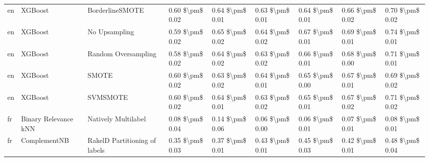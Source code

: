 \begin{tabular}{lllllllll}
      en &                         XGBoost &               BorderlineSMOTE & 0.60 \$\textbackslash pm\$ 0.02 &           0.64 \$\textbackslash pm\$ 0.01 &       0.63 \$\textbackslash pm\$ 0.01 &        0.64 \$\textbackslash pm\$ 0.01 &                         0.66 \$\textbackslash pm\$ 0.02 &     0.70 \$\textbackslash pm\$ 0.02 \\
      en &                         XGBoost &                 No Upsampling & 0.59 \$\textbackslash pm\$ 0.02 &           0.65 \$\textbackslash pm\$ 0.02 &       0.64 \$\textbackslash pm\$ 0.02 &        0.67 \$\textbackslash pm\$ 0.01 &                         0.69 \$\textbackslash pm\$ 0.01 &     0.74 \$\textbackslash pm\$ 0.01 \\
      en &                         XGBoost &           Random Oversampling & 0.58 \$\textbackslash pm\$ 0.02 &           0.64 \$\textbackslash pm\$ 0.02 &       0.63 \$\textbackslash pm\$ 0.02 &        0.66 \$\textbackslash pm\$ 0.01 &                         0.68 \$\textbackslash pm\$ 0.00 &     0.71 \$\textbackslash pm\$ 0.01 \\
      en &                         XGBoost &                         SMOTE & 0.60 \$\textbackslash pm\$ 0.02 &           0.63 \$\textbackslash pm\$ 0.02 &       0.64 \$\textbackslash pm\$ 0.01 &        0.65 \$\textbackslash pm\$ 0.00 &                         0.67 \$\textbackslash pm\$ 0.01 &     0.69 \$\textbackslash pm\$ 0.02 \\
      en &                         XGBoost &                      SVMSMOTE & 0.60 \$\textbackslash pm\$ 0.02 &           0.64 \$\textbackslash pm\$ 0.01 &       0.63 \$\textbackslash pm\$ 0.02 &        0.65 \$\textbackslash pm\$ 0.01 &                         0.67 \$\textbackslash pm\$ 0.02 &     0.71 \$\textbackslash pm\$ 0.02 \\
      fr &            Binary Relevance kNN &           Natively Multilabel & 0.08 \$\textbackslash pm\$ 0.04 &           0.14 \$\textbackslash pm\$ 0.06 &       0.06 \$\textbackslash pm\$ 0.00 &        0.06 \$\textbackslash pm\$ 0.01 &                         0.07 \$\textbackslash pm\$ 0.01 &     0.08 \$\textbackslash pm\$ 0.01 \\
      fr &                    ComplementNB & RakelD Partitioning of labels & 0.35 \$\textbackslash pm\$ 0.03 &           0.37 \$\textbackslash pm\$ 0.01 &       0.43 \$\textbackslash pm\$ 0.01 &        0.45 \$\textbackslash pm\$ 0.03 &                         0.42 \$\textbackslash pm\$ 0.01 &     0.48 \$\textbackslash pm\$ 0.04 \\

\end{tabular}
